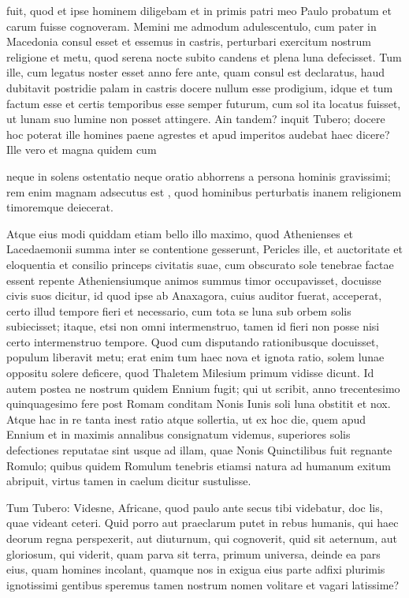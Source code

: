  fuit, quod et ipse hominem diligebam et in primis patri meo Paulo probatum et carum fuisse cognoveram. Memini me admodum adulescentulo, cum pater in Macedonia consul esset et essemus in castris, perturbari exercitum nostrum religione et metu, quod serena nocte subito candens et plena luna defecisset. Tum ille, cum legatus noster esset anno fere ante, quam consul est declaratus, haud dubitavit postridie palam in castris docere nullum esse prodigium, idque et tum factum esse et certis temporibus esse semper futurum, cum sol ita locatus fuisset, ut lunam suo lumine non posset attingere. Ain tandem? inquit Tubero; docere hoc poterat ille homines paene agrestes et apud imperitos audebat haec dicere? Ille vero et magna quidem cum

 neque in solens ostentatio neque oratio abhorrens a persona hominis gravissimi; rem enim magnam adsecutus est , quod hominibus perturbatis inanem religionem timoremque deiecerat.

 Atque eius modi quiddam etiam bello illo maximo, quod Athenienses et Lacedaemonii summa inter se contentione gesserunt, Pericles ille, et auctoritate et eloquentia et consilio princeps civitatis suae, cum obscurato sole tenebrae factae essent repente Atheniensiumque animos summus timor occupavisset, docuisse civis suos dicitur, id quod ipse ab Anaxagora, cuius auditor fuerat, acceperat, certo illud tempore fieri et necessario, cum tota se luna sub orbem solis subiecisset; itaque, etsi non omni intermenstruo, tamen id fieri non posse nisi certo intermenstruo tempore. Quod cum disputando rationibusque docuisset, populum liberavit metu; erat enim tum haec nova et ignota ratio, solem lunae oppositu solere deficere, quod Thaletem Milesium primum vidisse dicunt. Id autem postea ne nostrum quidem Ennium fugit; qui ut scribit, anno trecentesimo quinquagesimo fere post Romam conditam Nonis Iunis soli luna obstitit et nox. Atque hac in re tanta inest ratio atque sollertia, ut ex hoc die, quem apud Ennium et in maximis annalibus consignatum videmus, superiores solis defectiones reputatae sint usque ad illam, quae Nonis Quinctilibus fuit regnante Romulo; quibus quidem Romulum tenebris etiamsi natura ad humanum exitum abripuit, virtus tamen in caelum dicitur sustulisse.

 Tum Tubero: Videsne, Africane, quod paulo ante secus tibi videbatur, doc lis, quae videant ceteri. Quid porro aut praeclarum putet in rebus humanis, qui haec deorum regna perspexerit, aut diuturnum, qui cognoverit, quid sit aeternum, aut gloriosum, qui viderit, quam parva sit terra, primum universa, deinde ea pars eius, quam homines incolant, quamque nos in exigua eius parte adfixi plurimis ignotissimi gentibus speremus tamen nostrum nomen volitare et vagari latissime?

